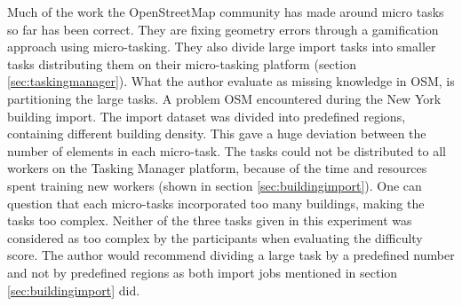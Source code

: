 Much of the work the OpenStreetMap community has made around micro tasks so far has been correct. They are fixing geometry errors through a gamification approach using micro-tasking. They also divide large import tasks into smaller tasks distributing them on their micro-tasking platform (section \ref{sec:taskingmanager}). What the author evaluate as missing knowledge in OSM, is partitioning the large tasks. A problem OSM encountered during the New York building import. The import dataset was divided into predefined regions, containing different building density. This gave a huge deviation between the number of elements in each micro-task. The tasks could not be distributed to all workers on the Tasking Manager platform, because of the time and resources spent training new workers (shown in section \ref{sec:buildingimport}). One can question that each micro-tasks incorporated too many buildings, making the tasks too complex. Neither of the three tasks given in this experiment was considered as too complex by the participants when evaluating the difficulty score. The author would recommend dividing a large task by a predefined number and not by predefined regions as both import jobs mentioned in section \ref{sec:buildingimport} did.




